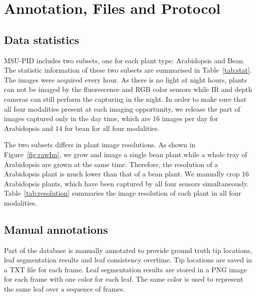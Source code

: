 \section{Annotation, Files and Protocol}



\subsection{Data statistics}
MSU-PID includes two subsets, one for each plant type: Arabidopsis and Bean.
The statistic information of these two subsets are summarised in Table~\ref{tab:stat}.
The images were acquired every hour.
As there is no light at night hours, plants can not be imaged by the fluorescence and RGB color sensors while IR and depth cameras can still perform the capturing in the night.
In order to make sure that all four modalities present at each imaging opportunity, we release the part of images captured only in the day time, which are $16$ images per day for Arabidopsis and $14$ for bean for all four modalities.



The two subsets differs in plant image resolutions.
As shown in Figure~\ref{fig:rawIm},  we grow and image a single bean plant while a whole tray of Arabidopsis are grown at the same time.
Therefore, the resolution of a Arabidopsis plant is much lower than that of a bean plant.
We manually crop $16$ Arabidopsis plants, which have been captured by all four sensors simultaneously.
Table~\ref{tab:resolution} summaries the image resolution of each plant in all four modalities.









\subsection{Manual annotations}
Part of the database is manually annotated to provide ground truth tip locations, leaf segmentation results and leaf consistency overtime.
Tip locations are saved in a TXT file for each frame.
Leaf segmentation results are stored in a PNG image for each frame with one color for each leaf.
The same color is used to represent the same leaf over a sequence of frames.

